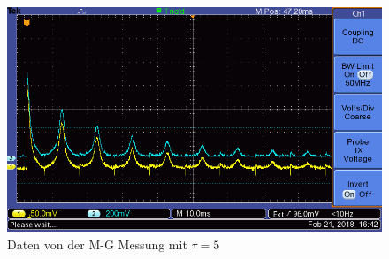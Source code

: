 \documentclass[12pt,a4paper]{article}
\begin{document}
\begin{figure}[H]
\includegraphics[scale=0.5]{Bilder/T2Anhang/T2plot5.png}
\caption{Daten von der M-G Messung mit $\tau = 5$}
\end{figure}
\end{document}
